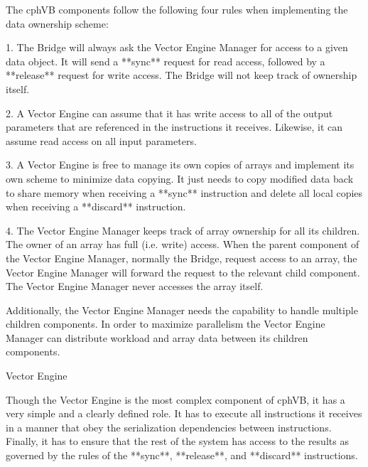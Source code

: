 The cphVB components follow the following four rules when implementing the data ownership scheme:

1. The Bridge will always ask the Vector Engine Manager for access to a given data object. It will send a **sync** request for read access, followed by a **release** request for write access. The Bridge will not keep track of ownership itself.

2. A Vector Engine can assume that it has write access to all of the output parameters that are referenced in the instructions it receives. Likewise, it can assume read access on all input parameters.

3. A Vector Engine is free to manage its own copies of arrays and implement its own scheme to minimize data copying. It just needs to copy modified data back to share memory when receiving a **sync** instruction and delete all local copies when receiving a **discard** instruction.

4. The Vector Engine Manager keeps track of array ownership for all its children. The owner of an array has full (i.e. write) access. When the parent component of the Vector Engine Manager, normally the Bridge, request access to an array, the Vector Engine Manager will forward the request to the relevant child component. The Vector Engine Manager never accesses the array itself.

Additionally, the Vector Engine Manager needs the capability to handle multiple children components. In order to maximize parallelism the Vector Engine Manager can distribute workload and array data between its children components.

Vector Engine
~~~~~~~~~~~~~

Though the Vector Engine is the most complex component of cphVB, it has a very simple and a clearly defined role. It has to execute all instructions it receives in a manner that obey the serialization dependencies between instructions. Finally, it has to ensure that the rest of the system has access to the results as governed by the rules of the **sync**, **release**, and **discard** instructions.

